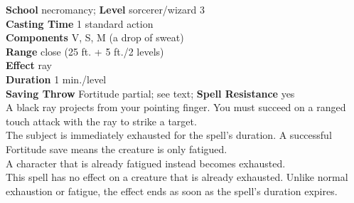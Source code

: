 \textbf{School} necromancy; \textbf{Level} sorcerer/wizard 3\\
\textbf{Casting Time} 1 standard action\\
\textbf{Components} V, S, M (a drop of sweat)\\
\textbf{Range} close (25 ft. + 5 ft./2 levels)\\
\textbf{Effect} ray\\
\textbf{Duration} 1 min./level\\
\textbf{Saving Throw} Fortitude partial; see text; \textbf{Spell Resistance} yes\\
A black ray projects from your pointing finger. You must succeed on a ranged touch attack with the ray to strike a target.\\
The subject is immediately exhausted for the spell's duration. A successful Fortitude save means the creature is only fatigued.\\
A character that is already fatigued instead becomes exhausted.\\
This spell has no effect on a creature that is already exhausted. Unlike normal exhaustion or fatigue, the effect ends as soon as the spell's duration expires.\\
